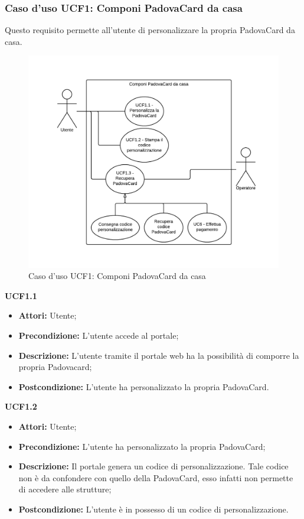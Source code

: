 \subsubsection{Caso d'uso UCF1: Componi PadovaCard da casa}
Questo requisito permette all'utente di personalizzare la propria PadovaCard da casa.
\begin{figure}[H]
\centering
\includegraphics[width=1\textwidth]{images/UCF1.png}
\caption{Caso d'uso UCF1:  Componi PadovaCard da casa}
\end{figure}
\textbf{UCF1.1}
\begin{itemize}
\item \textbf{Attori:} Utente;
\item \textbf{Precondizione:} L'utente accede al portale;
\item \textbf{Descrizione:} L'utente tramite il portale web ha la possibilità di comporre la propria Padovacard;
\item \textbf{Postcondizione:} L'utente ha personalizzato la propria PadovaCard.
\end{itemize}

\textbf{UCF1.2}
\begin{itemize}
\item \textbf{Attori:} Utente;
\item \textbf{Precondizione:} L'utente ha personalizzato la propria PadovaCard;
\item \textbf{Descrizione:} Il portale genera un codice di personalizzazione. Tale codice non è da confondere con quello della PadovaCard, esso infatti non permette di accedere alle strutture;
\item \textbf{Postcondizione:} L'utente è in possesso di un codice di personalizzazione.
\end{itemize}

